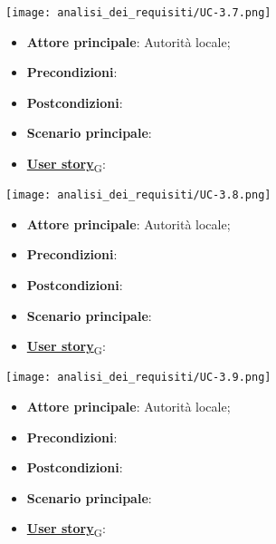\begin{center}
	\texttt{[image: analisi\_dei\_requisiti/UC-3.7.png]}
\end{center}

\begin{itemize}
	\item \textbf{Attore principale}: Autorità locale;
	\item \textbf{Precondizioni}:
	\item \textbf{Postcondizioni}:
	\item \textbf{Scenario principale}:
	\item \href{https://7last.github.io/docs/rtb/documentazione-interna/glossario\#user-story}{\textbf{User story}\textsubscript{G}}:
\end{itemize}

\begin{center}
	\texttt{[image: analisi\_dei\_requisiti/UC-3.8.png]}
\end{center}
\begin{itemize}
	\item \textbf{Attore principale}: Autorità locale;
	\item \textbf{Precondizioni}:
	\item \textbf{Postcondizioni}:
	\item \textbf{Scenario principale}:
	\item \href{https://7last.github.io/docs/rtb/documentazione-interna/glossario\#user-story}{\textbf{User story}\textsubscript{G}}:
\end{itemize}

\begin{center}
	\texttt{[image: analisi\_dei\_requisiti/UC-3.9.png]}
\end{center}

\begin{itemize}
	\item \textbf{Attore principale}: Autorità locale;
	\item \textbf{Precondizioni}:
	\item \textbf{Postcondizioni}:
	\item \textbf{Scenario principale}:
	\item \href{https://7last.github.io/docs/rtb/documentazione-interna/glossario\#user-story}{\textbf{User story}\textsubscript{G}}:
\end{itemize}

